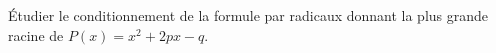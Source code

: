 
\begin{exercice}\label{exoSerieUn0008}

Étudier le conditionnement de la formule par radicaux donnant la plus grande racine de $P(x)=x^2+2px-q$.

\end{exercice}
